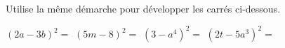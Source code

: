 %
%
Utilise la même démarche pour développer les carrés ci-dessous.
  \begin{tasks}
    \task $\left(2a-3b\right)^2=$
    \task $\left(5m-8\right)^2=$
    \task $\left(3-a^4\right)^2=$
    \task $\left(2t - 5a^3\right)^2=$
  \end{tasks}
